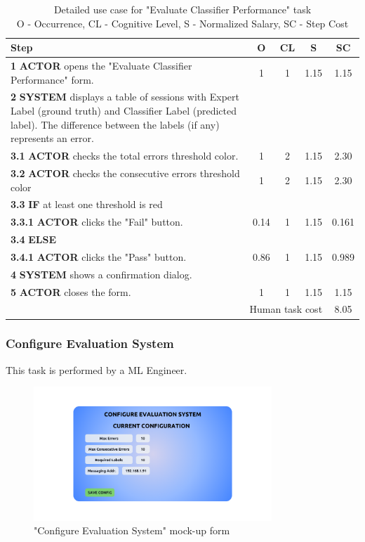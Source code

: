 \begin{table}[H]
\centering
\begin{tabularx}{\textwidth}{|X|c|c|c|c|}
\hline
\textbf{Step} & \textbf{O} & \textbf{CL} & \textbf{S} & \textbf{SC} \\
\hline
\textbf{1} \textbf{ACTOR} opens the "Evaluate Classifier Performance" form. & 1 & 1 & 1.15 & 1.15 \\
\hline
\textbf{2} \textbf{SYSTEM} displays a table of sessions with Expert Label (ground truth) and Classifier Label (predicted label). 
The difference between the labels (if any) represents an error. & & & & \\
\hline
\textbf{3.1} \textbf{ACTOR} checks the total errors threshold color. &1 & 2& 1.15&2.30 \\
\hline
\textbf{3.2} \textbf{ACTOR} checks the consecutive errors threshold color &1 & 2& 1.15&2.30 \\
\hline
\textbf{3.3} \textbf{IF} at least one threshold is red &  &  & & \\
\hline
\textbf{3.3.1} \textbf{ACTOR} clicks the "Fail" button. & 0.14 & 1 & 1.15& 0.161 \\
\hline
\textbf{3.4} \textbf{ELSE} & & & & \\
\hline
\textbf{3.4.1} \textbf{ACTOR} clicks the "Pass" button. & 0.86 & 1 & 1.15& 0.989 \\
\hline
\textbf{4} \textbf{SYSTEM} shows a confirmation dialog. & & & &\\
\hline
\textbf{5} \textbf{ACTOR} closes the form. & 1 & 1 & 1.15 &1.15\\
\hline
\multicolumn{4}{|r|}{Human task cost} &8.05 \\
\hline
\end{tabularx}
\caption{Detailed use case for "Evaluate Classifier Performance" task\\ 
O - Occurrence, CL - Cognitive Level, S - Normalized Salary, SC - Step Cost}
\label{table:evaluate_classifier_performance}
\end{table}

\subsubsection{Configure Evaluation System}

This task is performed by a ML Engineer.

\begin{figure}[H]
\centering
\includegraphics[width=0.8\textwidth]{figures/ui_configure_evaluation.png}
\caption{"Configure Evaluation System" mock-up form}
\end{figure}

